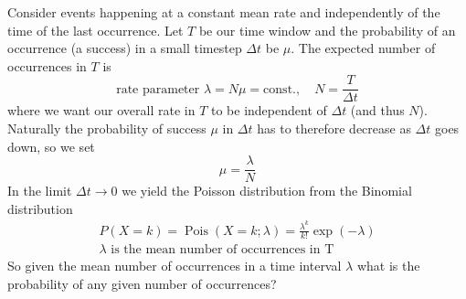 
Consider events happening at a constant mean rate and independently of the time of the last
occurrence. Let $T$ be our time window and the probability of an occurrence (a success) in
a small timestep $\Delta t$ be $\mu$. The expected number of occurrences in $T$ is
\begin{equation}
    \text{rate parameter } \lambda = N\mu = \text{const.}, \quad N = \frac{T}{\Delta t}
\end{equation}
where we want our overall rate in $T$ to be independent of $\Delta t$ (and thus $N$).
Naturally the probability of success $\mu$ in $\Delta t$ has to therefore decrease as
$\Delta t$ goes down, so we set
\begin{equation}
    \mu = \frac{\lambda}{N}
\end{equation}
In the limit $\Delta t \rightarrow 0$ we yield the Poisson distribution from the 
Binomial distribution
\begin{equation}
    \begin{gathered}
        P(X=k) = \operatorname{Pois}(X=k;\lambda) = \frac{\lambda^k}{k!} \exp{(-\lambda)} \\
        \lambda \text{ is the mean number of occurrences in T}
    \end{gathered}
\end{equation}
So given the mean number of occurrences in a time interval $\lambda$ what is the probability
of any given number of occurrences?


